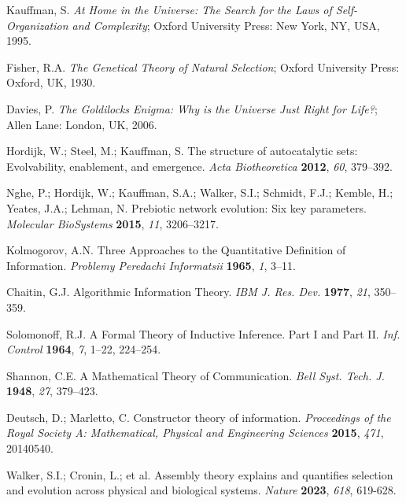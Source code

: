 \documentclass[preprint,12pt]{elsarticle}
\begin{document}
\begin{thebibliography}{999}

Kauffman, S. \textit{At Home in the Universe: The Search for the Laws of Self-Organization and Complexity}; Oxford University Press: New York, NY, USA, 1995.

Fisher, R.A. \textit{The Genetical Theory of Natural Selection}; Oxford University Press: Oxford, UK, 1930.

Davies, P. \textit{The Goldilocks Enigma: Why is the Universe Just Right for Life?}; Allen Lane: London, UK, 2006.

Hordijk, W.; Steel, M.; Kauffman, S. The structure of autocatalytic sets: Evolvability, enablement, and emergence. \textit{Acta Biotheoretica} \textbf{2012}, \textit{60}, 379–392.

Nghe, P.; Hordijk, W.; Kauffman, S.A.; Walker, S.I.; Schmidt, F.J.; Kemble, H.; Yeates, J.A.; Lehman, N. Prebiotic network evolution: Six key parameters. \textit{Molecular BioSystems} \textbf{2015}, \textit{11}, 3206–3217.

Kolmogorov, A.N. Three Approaches to the Quantitative Definition of Information. \textit{Problemy Peredachi Informatsii} \textbf{1965}, \textit{1}, 3–11.

Chaitin, G.J. Algorithmic Information Theory. \textit{IBM J. Res. Dev.} \textbf{1977}, \textit{21}, 350–359.

Solomonoff, R.J. A Formal Theory of Inductive Inference. Part I and Part II. \textit{Inf. Control} \textbf{1964}, \textit{7}, 1–22, 224–254.

Shannon, C.E. A Mathematical Theory of Communication. \textit{Bell Syst. Tech. J.} \textbf{1948}, \textit{27}, 379–423.

Deutsch, D.; Marletto, C. Constructor theory of information. \textit{Proceedings of the Royal Society A: Mathematical, Physical and Engineering Sciences} \textbf{2015}, \textit{471}, 20140540.

Walker, S.I.; Cronin, L.; et al. Assembly theory explains and quantifies selection and evolution across physical and biological systems. \textit{Nature} \textbf{2023}, \textit{618}, 619-628.


\end{thebibliography}
\end{document}
